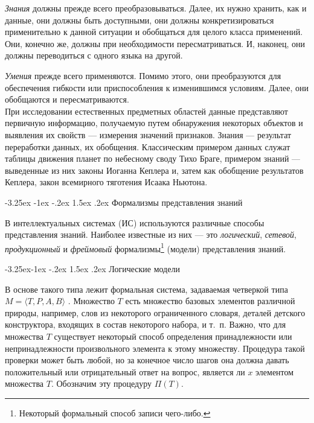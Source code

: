 \documentclass[12pt, openany, twoside]{book} %
\makeatletter
\renewcommand\section{\@startsection {section}{1}{\z@}%
                                   {-3.25ex \@plus -1ex \@minus -.2ex}%
                                   {1.5ex \@plus.2ex}%
                                   {\normalfont\large\bfseries}}
\renewcommand\subsection{\@startsection{subsection}{2}{\z@}%
                                     {-3.25ex\@plus -1ex \@minus -.2ex}%
                                     {1.5ex \@plus .2ex}%
                                     {\normalfont\normalsize\bfseries}}
\makeatother
\begin{document}
    {\em Знания} должны прежде всего преобразовываться. Далее, их нужно хранить, как и данные, они должны быть доступными, они должны конкретизироваться применительно к данной ситуации и обобщаться для целого класса применений. Они, конечно же, должны при необходимости пересматриваться. И, наконец, они должны переводиться с одного языка на другой.

    {\em Умения} прежде всего применяются. Помимо этого, они преобразуются для обеспечения гибкости или приспособления к изменившимся условиям. Далее, они обобщаются и пересматриваются.\\[1ex]

При исследовании естественных предметных областей данные представляют первичную информацию, получаемую путем обнаружения некоторых объектов и выявления их свойств --- измерения значений признаков. Знания --- результат переработки данных, их обобщения. Классическим примером данных служат таблицы движения планет по небесному своду Тихо Браге, примером знаний --- выведенные из них законы Иоганна Кеплера и, затем как обобщение результатов Кеплера, закон всемирного тяготения Исаака Ньютона.

\section{Формализмы представления знаний}
\label{sec:knowlege_repr}

В интеллектуальных системах (ИС) используются различные способы представления знаний. Наиболее известные из них --- это {\em логический}, {\em сетевой}, {\em продукционный} и {\em фреймовый} формализмы\footnote{Некоторый формальный способ записи чего-либо.} (модели) представления знаний.

\subsection{Логические модели}

 В основе такого типа лежит формальная система, задаваемая четверкой типа $M=\langle T, P, A, B\rangle$ \cite{AIDictionary}. Множество $T$ есть множество базовых элементов различной природы, например, слов из некоторого ограниченного словаря, деталей детского конструктора, входящих в состав некоторого набора, и т.~п. Важно, что для множества $T$ существует некоторый способ определения принадлежности или непринадлежности произвольного элемента к этому множеству. Процедура такой проверки может быть любой, но за конечное число шагов она должна давать положительный или отрицательный ответ на вопрос, является ли $x$ элементом множества $T$. Обозначим эту процедуру $\Pi(T)$.
\end{document}
